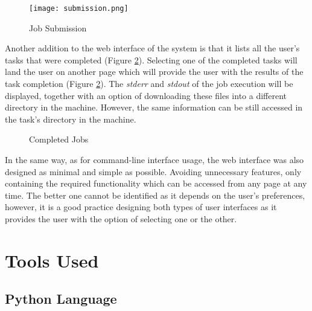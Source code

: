 \documentclass[10pt]{report}
\begin{document}
\begin{figure}[htp]
    \centering
    \texttt{[image: submission.png]}
    \caption{Job Submission}
    \label{fig:submission}
\end{figure}

Another addition to the web interface of the system is that it lists all the user's tasks that were completed (Figure \ref{fig:completed}). Selecting one of the completed tasks will land the user on another page which will provide the user with the results of the task completion (Figure \ref{fig:completed}). The \textit{stderr} and \textit{stdout} of the job execution will be displayed, together with an option of downloading these files into a different directory in the machine. However, the same information can be still accessed in the task's directory in the machine.
\newline

\begin{figure}[htbp]
    \centering
    \qquad
    \caption{Completed Jobs}
    \label{fig:completed}
\end{figure}

In the same way, as for command-line interface usage, the web interface was also designed as minimal and simple as possible. Avoiding unnecessary features, only containing the required functionality which can be accessed from any page at any time. The better one cannot be identified as it depends on the user's preferences, however, it is a good practice designing both types of user interfaces as it provides the user with the option of selecting one or the other.

\section{Tools Used}

\subsection{Python Language}
\end{document}
